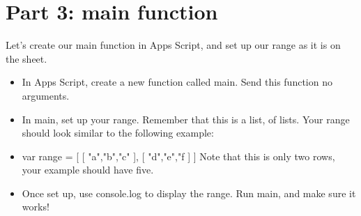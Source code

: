 \documentclass{article}
\begin{document}
\section*{Part 3: main function}
Let's create our main function in Apps Script, and set up our range as it is on the sheet.
\begin{itemize}
    \item In Apps Script, create a new function called main.  Send this function no arguments.
    \item In main, set up your range.  Remember that this is a list, of lists.  Your range should look similar to the following example:
    \item var range = [ [ "a","b","c" ], [ "d","e","f ] ]  Note that this is only two rows, your example should have five.
    \item Once set up, use console.log to display the range.  Run main, and make sure it works!
\end{itemize}
\end{document}
